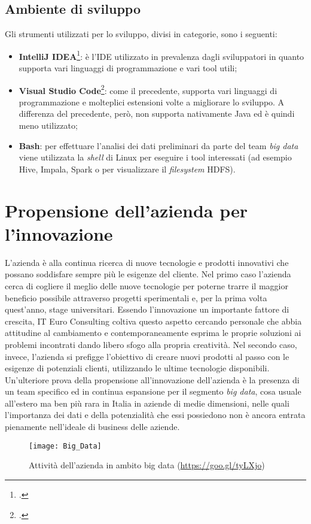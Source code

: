 \subsection{Ambiente di sviluppo}
Gli strumenti utilizzati per lo sviluppo, divisi in categorie, sono i seguenti:
\begin{itemize}
	\item \textbf{IntelliJ IDEA}\footcite{https://www.jetbrains.com/idea/}: è l'\gls{IDE} utilizzato in prevalenza dagli sviluppatori in quanto supporta vari linguaggi di programmazione e vari tool utili;
	\item \textbf{Visual Studio Code}\footcite{https://code.visualstudio.com/}: come il precedente, supporta vari linguaggi di programmazione e molteplici estensioni volte a migliorare lo sviluppo. A differenza del precedente, però, non supporta nativamente Java ed è quindi meno utilizzato;
	\item \textbf{\gls{Bash}}: per effettuare l'analisi dei dati preliminari da parte del team \textit{big data} viene utilizzata la \textit{shell} di Linux per eseguire i tool interessati (ad esempio Hive, Impala, Spark o per visualizzare il \textit{filesystem} HDFS).
\end{itemize}

\section{Propensione dell'azienda per l'innovazione}
L’azienda è alla continua ricerca di nuove tecnologie e prodotti innovativi che possano soddisfare sempre più le esigenze del cliente. Nel primo caso l’azienda cerca di cogliere il meglio delle nuove tecnologie per poterne trarre il maggior beneficio possibile attraverso progetti sperimentali e, per la prima volta quest’anno, stage universitari. Essendo l’innovazione un importante fattore di crescita, IT Euro Consulting coltiva questo aspetto cercando personale che abbia attitudine al cambiamento e contemporaneamente esprima le proprie soluzioni ai problemi incontrati dando libero sfogo alla propria creatività. Nel secondo caso, invece, l’azienda si prefigge l’obiettivo di creare nuovi prodotti al passo con le esigenze di potenziali clienti, utilizzando le ultime tecnologie disponibili.\\
Un'ulteriore prova della propensione all'innovazione dell'azienda è la presenza di un team specifico ed in continua espansione per il segmento \textit{big data}, cosa usuale all'estero ma ben più rara in Italia in aziende di medie dimensioni, nelle quali l'importanza dei dati e della potenzialità che essi possiedono non è ancora entrata pienamente nell'ideale di business delle aziende.
\begin{figure}[!h] 
	\centering 
	\texttt{[image: Big\_Data]} 
	\caption{Attività dell'azienda in ambito big data (\href{https://goo.gl/tyLXjo}{https://goo.gl/tyLXjo})}
\end{figure}
